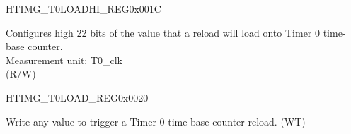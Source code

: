 \begin{register}{H}{TIMG\_T0LOADHI\_REG}{0x001C}\label{regdesc:TIMGTXLOADHIREG}
%
%
\regnewline%
\begin{regdesc}\begin{reglist}
\label{fielddesc:TIMGTXLOADHI}\item [TIMG\_T0\_LOAD\_HI] Configures high 22 bits of the value that a reload will load onto Timer 0 time-base counter. \\
Measurement unit: T0\_clk \\
(R/W)
\end{reglist}\end{regdesc}
\end{register}


\begin{register}{H}{TIMG\_T0LOAD\_REG}{0x0020}\label{regdesc:TIMGTXLOADREG}
%
\regnewline%
\begin{regdesc}\begin{reglist}
\label{fielddesc:TIMGTXLOAD}\item [TIMG\_T0\_LOAD] Write any value to trigger a Timer 0 time-base counter reload. (WT)\\
\end{reglist}\end{regdesc}
\end{register}



